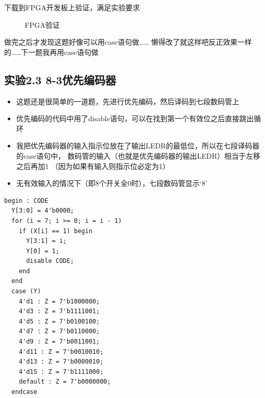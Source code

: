 \documentclass[12pt,a4paper,UTF8]{article}
\begin{document}
下载到FPGA开发板上验证，满足实验要求
\begin{figure}[H]
  \centering
  \caption{FPGA验证}
  \label{fpga}
\end{figure}

做完之后才发现这题好像可以用case语句做……
懒得改了就这样吧反正效果一样的……下一题我再用case语句做

\subsection{实验2.3 8-3优先编码器}
\begin{itemize}
  \item 这题还是很简单的一道题，先进行优先编码，然后译码到七段数码管上
  \item 优先编码的代码中用了disable语句，可以在找到第一个有效位之后直接跳出循环
  \item 我把优先编码器的输入指示位放在了输出LEDR的最低位，所以在七段译码器的case语句中，
        数码管的输入（也就是优先编码器的输出LEDR）相当于左移之后再加1
        （因为如果有输入则指示位必定为1）
  \item 无有效输入的情况下（即8个开关全0时），七段数码管显示`8'
\end{itemize}
\begin{lstlisting}[style=verilog-style]
  begin : CODE
  Y[3:0] = 4'b0000;
  for (i = 7; i >= 0; i = i - 1)
    if (X[i] == 1) begin
      Y[3:1] = i;
      Y[0] = 1;
      disable CODE;
    end
  end
  case (Y)
    4'd1 : Z = 7'b1000000;
    4'd3 : Z = 7'b1111001;
    4'd5 : Z = 7'b0100100;
    4'd7 : Z = 7'b0110000;
    4'd9 : Z = 7'b0011001;
    4'd11 : Z = 7'b0010010;
    4'd13 : Z = 7'b0000010;
    4'd15 : Z = 7'b1111000;
    default : Z = 7'b0000000;
  endcase
\end{lstlisting}
\end{document}
